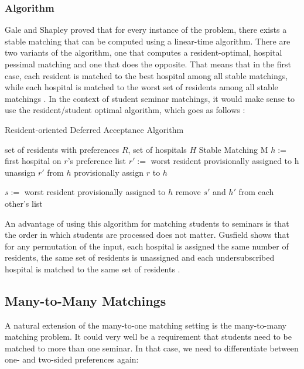 \subsubsection{Algorithm}
Gale and Shapley \cite{GaleShapleyOrig} proved that for every instance of the problem, there exists a stable matching that can be computed using a linear-time algorithm. There are two variants of the algorithm, one that computes a resident-optimal, hospital pessimal matching and one that does the opposite. That means that in the first case, each resident is matched to the best hospital among all stable matchings, while each hospital is matched to the worst set of residents among all stable matchings \cite{Gusfield}. In the context of student seminar matchings, it would make sense to use the resident/student optimal algorithm, which goes as follows \cite{Gusfield}:
\begin{algorithm} %
    \caption{Resident-oriented Deferred Acceptance Algorithm} 
    \label{alg:resident-oriented-algorithm} 
    \begin{algorithmic} %
        \Require set of residents with preferences $R$, set of hospitals $H$
        \Ensure Stable Matching M
        \State $h:=$ first hospital on $r$'s preference list
            \State $r':=$ worst resident provisionally assigned to h
            \State unassign $r'$ from $h$
        \EndIf
        \State provisionally assign $r$ to $h$

            $s:=$ worst resident provisionally assigned to $h$
                \State remove $s'$ and $h'$ from each other's list
            \EndFor
        \EndIf

        \EndWhile
    \end{algorithmic}
\end{algorithm}

An advantage of using this algorithm for matching students to seminars is that the order in which students are processed does not matter. Gusfield shows that for any permutation of the input, each hospital is assigned the same number of residents, the same set of residents is unassigned and each undersubscribed hospital is matched to the same set of residents \cite{Gusfield}.

\subsection{Many-to-Many Matchings}
A natural extension of the many-to-one matching setting is the many-to-many matching problem. It could very well be a requirement that students need to be matched to more than one seminar. In that case, we need to differentiate between one- and two-sided preferences again:


